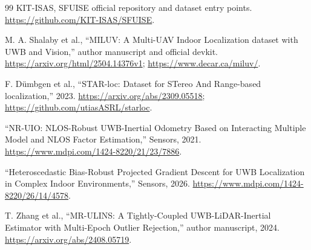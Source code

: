 \documentclass[UTF8,fontset=fandol,11pt,a4paper]{ctexart}
\begin{document}
\begin{thebibliography}{99}
 KIT-ISAS, SFUISE official repository and dataset entry points.
\url{https://github.com/KIT-ISAS/SFUISE}.

 M. A. Shalaby et al., ``MILUV: A Multi-UAV Indoor Localization dataset with UWB and Vision,'' author manuscript and official devkit.
\url{https://arxiv.org/html/2504.14376v1}; \url{https://www.decar.ca/miluv/}.

 F. D\"umbgen et al., ``STAR-loc: Dataset for STereo And Range-based localization,'' 2023.
\url{https://arxiv.org/abs/2309.05518}; \url{https://github.com/utiasASRL/starloc}.

 ``NR-UIO: NLOS-Robust UWB-Inertial Odometry Based on Interacting Multiple Model and NLOS Factor Estimation,'' Sensors, 2021.
\url{https://www.mdpi.com/1424-8220/21/23/7886}.

 ``Heteroscedastic Bias-Robust Projected Gradient Descent for UWB Localization in Complex Indoor Environments,'' Sensors, 2026.
\url{https://www.mdpi.com/1424-8220/26/14/4578}.

 T. Zhang et al., ``MR-ULINS: A Tightly-Coupled UWB-LiDAR-Inertial Estimator with Multi-Epoch Outlier Rejection,'' author manuscript, 2024.
\url{https://arxiv.org/abs/2408.05719}.
\end{thebibliography}
\end{document}
